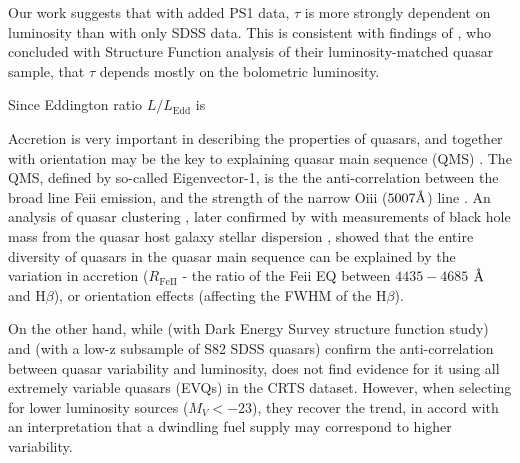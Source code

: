 \documentclass[twocolumn]{aastex62}
\let\oldAA\AA
\renewcommand{\AA}{\text{\normalfont\oldAA}}
\begin{document}
 Our work suggests that with added PS1 data, $\tau$ is more strongly dependent on luminosity than with only SDSS data.  This is consistent with findings of \cite{sun2018}, who concluded with Structure Function analysis of their luminosity-matched quasar sample, that $\tau$ depends mostly on the bolometric luminosity. 

 Since Eddington ratio $L/L_{\mathrm{Edd}}$ is 



Accretion is very important in describing the properties of quasars, and together with orientation may be the key to explaining quasar main sequence (QMS) \citep{shen2014}. The QMS, defined by so-called Eigenvector-1, is the the anti-correlation between the broad line Fe{\sc ii} emission, and the strength of the narrow O{\sc iii} ($5007 \mbox{\AA}$) line \citep{wang1996}. An analysis of quasar clustering \citep{shen2014}, later confirmed by \citet{sun2015} with measurements of  black hole mass from the quasar host galaxy stellar dispersion \citep{ferrarese2000, kormendy2013}, showed that the entire diversity of quasars in  the quasar main sequence can be explained by the variation in accretion ($R_{\mathrm{Fe  II}}$ - the ratio of the  Fe{\sc ii} EQ  between $4435-4685$ $\mbox{\AA}$ and H$\beta$), or orientation effects (affecting the FWHM of the H$\beta$). \

On the other hand, while  \citealt{rumbaugh2018} (with Dark Energy Survey structure function study) and  \citet{sun2018}  (with a low-z subsample of S82 SDSS quasars) confirm the anti-correlation between quasar variability and luminosity, \citealt{graham2019} does not find evidence for it using all extremely variable quasars (EVQs) in the CRTS dataset. However, when selecting for lower luminosity sources ($M_{V} < -23$), they recover the trend, in accord with an interpretation that a dwindling fuel supply may correspond to higher variability. 


\end{document}
